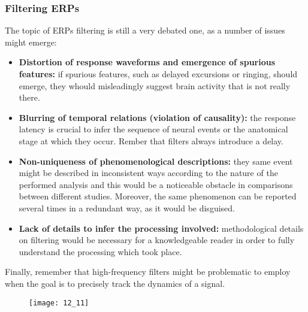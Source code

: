 \subsubsection{Filtering ERPs}
The topic of ERPs filtering is still a very debated one, as a number of issues might emerge:
\begin{itemize}
    \item \textbf{Distortion of response waveforms and emergence of spurious features:} if spurious
    features, such as delayed excursions or ringing, should emerge, they whould misleadingly
    suggest brain activity that is not really there.
    \item \textbf{Blurring of temporal relations (violation of causality):} the response latency is
    crucial to infer the sequence of neural events or the anatomical stage at which they
    occur. Rember that filters always introduce a delay.
    \item \textbf{Non-uniqueness of phenomenological descriptions:} they same event might be
    described in inconsistent ways according to the nature of the performed analysis and
    this would be a noticeable obstacle in comparisons between different studies. Moreover,
    the same phenomenon can be reported several times in a redundant way, as it would be
    disguised.
    \item \textbf{Lack of details to infer the processing involved:} methodological details
    on filtering would be necessary for a knowledgeable reader in order to fully understand
    the processing which took place.
\end{itemize}
Finally, remember that high-frequency filters might be problematic to employ when the goal is
to precisely track the dynamics of a signal.
\begin{figure}[H]
    \centering
    \texttt{[image: 12\_11]}
\end{figure}
